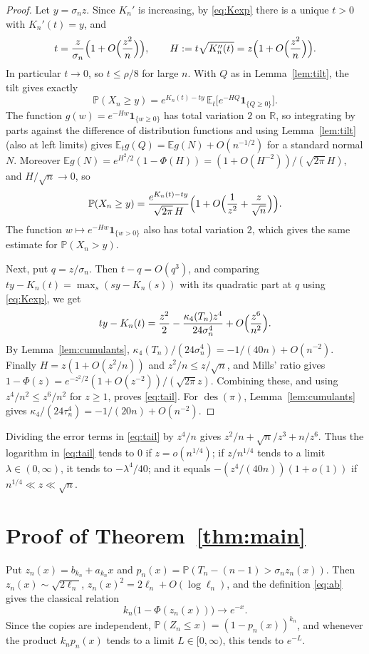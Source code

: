 \documentclass[11pt]{amsart}
\theoremstyle{remark}
\newcommand{\des}{\operatorname{des}}
\newcommand{\E}{\mathbb{E}}
\renewcommand{\P}{\mathbb{P}}
\newcommand{\R}{\mathbb{R}}
\begin{document}
\begin{proof}
Let $y=\sigma_nz$. Since $K_n'$ is increasing, by \eqref{eq:Kexp} there is a unique $t>0$ with $K_n'(t)=y$, and
\[
t=\frac z{\sigma_n}\Bigl(1+O\Bigl(\frac{z^2}n\Bigr)\Bigr),\qquad H:=t\sqrt{K_n''(t)}=z\Bigl(1+O\Bigl(\frac{z^2}n\Bigr)\Bigr).
\]
In particular $t\to0$, so $t\le\rho/8$ for large $n$. With $Q$ as in Lemma~\ref{lem:tilt}, the tilt gives exactly
\[
\P(X_n\ge y)=e^{K_n(t)-ty}\,\E_t\bigl[e^{-HQ}\mathbf 1_{\{Q\ge0\}}\bigr].
\]
The function $g(w)=e^{-Hw}\mathbf 1_{\{w\ge0\}}$ has total variation $2$ on $\R$, so integrating by parts against the difference of distribution functions and using Lemma~\ref{lem:tilt} (also at left limits) gives $\E_t g(Q)=\E g(N)+O(n^{-1/2})$ for a standard normal $N$. Moreover $\E g(N)=e^{H^2/2}(1-\Phi(H))=(1+O(H^{-2}))/(\sqrt{2\pi}H)$, and $H/\sqrt n\to0$, so
\[
\P(X_n\ge y)=\frac{e^{K_n(t)-ty}}{\sqrt{2\pi}\,H}\Bigl(1+O\Bigl(\frac1{z^2}+\frac z{\sqrt n}\Bigr)\Bigr).
\]
The function $w\mapsto e^{-Hw}\mathbf 1_{\{w>0\}}$ also has total variation $2$, which gives the same estimate for $\P(X_n>y)$.

Next, put $q=z/\sigma_n$. Then $t-q=O(q^3)$, and comparing $ty-K_n(t)=\max_s(sy-K_n(s))$ with its quadratic part at $q$ using \eqref{eq:Kexp}, we get
\[
ty-K_n(t)=\frac{z^2}2-\frac{\kappa_4(T_n)z^4}{24\sigma_n^4}+O\Bigl(\frac{z^6}{n^2}\Bigr).
\]
By Lemma~\ref{lem:cumulants}, $\kappa_4(T_n)/(24\sigma_n^4)=-1/(40n)+O(n^{-2})$. Finally $H=z(1+O(z^2/n))$ and $z^2/n\le z/\sqrt n$, and Mills' ratio gives $1-\Phi(z)=e^{-z^2/2}(1+O(z^{-2}))/(\sqrt{2\pi}z)$. Combining these, and using $z^4/n^2\le z^6/n^2$ for $z\ge1$, proves \eqref{eq:tail}. For $\des(\pi)$, Lemma~\ref{lem:cumulants} gives $\kappa_4/(24\tau_n^4)=-1/(20n)+O(n^{-2})$.
\end{proof}

Dividing the error terms in \eqref{eq:tail} by $z^4/n$ gives $z^2/n+\sqrt n/z^3+n/z^6$. Thus the logarithm in \eqref{eq:tail} tends to $0$ if $z=o(n^{1/4})$; if $z/n^{1/4}$ tends to a limit $\lambda\in(0,\infty)$, it tends to $-\lambda^4/40$; and it equals $-(z^4/(40n))(1+o(1))$ if $n^{1/4}\ll z\ll\sqrt n$.

\section{Proof of Theorem~\ref{thm:main}}\label{sec:max}

Put $z_n(x)=b_{k_n}+a_{k_n}x$ and $p_n(x)=\P(T_n-(n-1)>\sigma_nz_n(x))$. Then $z_n(x)\sim\sqrt{2\ell_n}$, $z_n(x)^2=2\ell_n+O(\log\ell_n)$, and the definition \eqref{eq:ab} gives the classical relation
\begin{equation}\label{eq:normalk}
k_n\bigl(1-\Phi(z_n(x))\bigr)\to e^{-x}.
\end{equation}
Since the copies are independent, $\P(Z_n\le x)=(1-p_n(x))^{k_n}$, and whenever the product $k_np_n(x)$ tends to a limit $L\in[0,\infty)$, this tends to $e^{-L}$.
\end{document}
